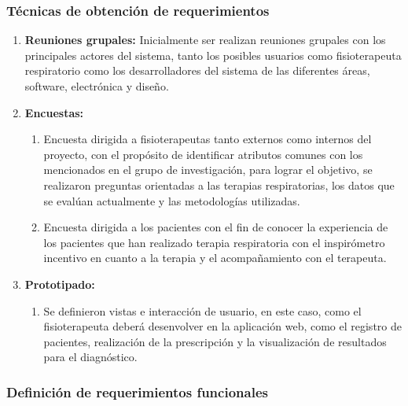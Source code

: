 \documentclass[12pt]{article}
\begin{document}
\subsubsection{Técnicas de obtención de requerimientos}

\begin{enumerate}
    \item \textbf{Reuniones grupales:} Inicialmente ser realizan reuniones grupales con los principales actores del sistema, tanto los posibles usuarios como fisioterapeuta respiratorio como los desarrolladores del sistema de las diferentes áreas, software, electrónica y diseño.
    \item \textbf{Encuestas:} 
        \begin{enumerate}
            \item Encuesta dirigida a fisioterapeutas tanto externos como internos del proyecto, con el propósito de identificar atributos comunes con los mencionados en el grupo de investigación, para lograr el objetivo, se realizaron preguntas orientadas a las terapias respiratorias, los datos que se evalúan actualmente y las metodologías utilizadas.
            \item Encuesta dirigida a los pacientes con el fin de conocer la experiencia de los pacientes que han realizado terapia respiratoria con el inspirómetro incentivo en cuanto a la terapia y el acompañamiento con el terapeuta.
        \end{enumerate}
        
    \item \textbf{Prototipado:} 
    
        \begin{enumerate}
            \item Se definieron vistas e interacción de usuario, en este caso, como el fisioterapeuta deberá desenvolver en la aplicación web, como el registro de pacientes, realización de la prescripción y la visualización de resultados para el diagnóstico.
        \end{enumerate}
    
    
\end{enumerate}




\subsubsection{Definición de requerimientos funcionales}

\end{document}

